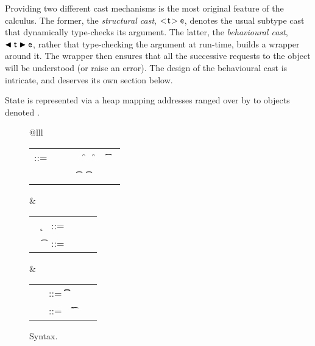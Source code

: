 \documentclass[acmlarge, anonymous, authordraft]{acmart}
\begin{document}
 Providing two different cast mechanisms is the most original feature of the calculus.
The former, the \emph{structural cast}, \(\SubCast\t\e\), denotes the usual subtype cast that dynamically type-checks its argument.  The latter, the \emph{behavioural cast}, \(\BehCast\t\e\), rather that type-checking the argument at run-time, builds a wrapper around it.  The wrapper then ensures that all the successive requests to the object will be  understood (or raise an error). The design of the behavioural cast is intricate, and deserves its own section below.  

State is represented via a heap \s mapping addresses ranged over by \a
to objects denoted \hspace{-1mm}\obj\C{\b\a}.

\begin{figure}[!h]
\hrulefill

\vspace{4mm}

\small
\begin{tabular}{@{}lll}

\begin{minipage}{9cm}\begin{tabular}{@{}l@{~}l@{}l@{}l@{}l@{}l@{}l@{}l}
\e\hspace{.1cm} ::= & \hspace{.2cm} \x        
    &\B \this         
   &\B \that      
   &\B \FRead\f     
   &\B \FWrite\f\e   
   &\B \KCall\e\m\e\t\t \\
   & &
   &\B \SubCast\t\e 
   &\B \BehCast\t\e 
   &\B \New\C{\b\e}  
   &\B \DynCall\e\m\e 
\end{tabular}\end{minipage}&
\begin{minipage}{2.9cm}\begin{tabular}{l@{~}l@{}l@{}l}
   ~ \k &::= \Class \C {\b\fd}{\b\md} \\
~ \t&::= ~ \any  \B   \C  \\ 
\end{tabular}\end{minipage} &
\begin{minipage}{2.9cm}\begin{tabular}{l@{~}l@{}l@{}l}
\md &::= \Mdef\m\x\t\t\e \\
~\fd&::= ~ \Fdef\f\t \\ 
\end{tabular}\end{minipage}\end{tabular}

\vspace{4mm}

\noindent\hrulefill
\caption{\kafka Syntax.}\label{syn}
\end{figure}
\end{document}
